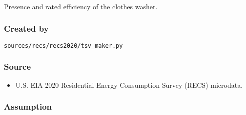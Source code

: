 Presence and rated efficiency of the clothes washer.

\subsubsection{Created by}\label{created-by-17}

\texttt{sources/recs/recs2020/tsv\_maker.py}

\subsubsection{Source}\label{source-17}

\begin{itemize}
 
\item
  U.S. EIA 2020 Residential Energy Consumption Survey (RECS) microdata.
\end{itemize}

\subsubsection{Assumption}\label{assumption-8}

